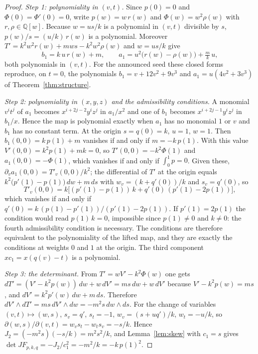 \documentclass[11pt]{article}
\theoremstyle{definition}
\theoremstyle{remark}
\newcommand{\Q}{\mathbb{Q}}
\begin{document}
\begin{proof}
\emph{Step 1: polynomiality in $(v,t)$.} Since $p(0) = 0$ and $\Phi(0) = \Phi'(0) = 0$, write $p(w) = w\,r(w)$ and $\Phi(w) = w^2\rho(w)$ with $r, \rho \in \Q[w]$. Because $w = us/k$ is a polynomial in $(v,t)$ divisible by $s$, $p(w)/s = (u/k)\,r(w)$ is a polynomial. Moreover $T' = k^2 w^2 r(w) + m w s - k^2 w^2\rho(w)$ and $w = us/k$ give
\begin{equation}\label{eq:closed}
b_1 = k\,u\,r(w) + m, \qquad a_1 = u^2\bigl(r(w) - \rho(w)\bigr) + \tfrac{m}{k}\,u,
\end{equation}
both polynomials in $(v,t)$. For the announced seed these closed forms reproduce, on $t = 0$, the polynomials $b_1 = v + 12v^2 + 9v^3$ and $a_1 = u(4v^2 + 3v^3)$ of Theorem~\ref{thm:structure}.

\emph{Step 2: polynomiality in $(x,y,z)$ and the admissibility conditions.} A monomial $v^i t^j$ of $a_1$ becomes $x^{i+2j-2}y^iz^j$ in $a_1/x^2$ and one of $b_1$ becomes $x^{i+2j-1}y^iz^j$ in $b_1/x$. Hence the map is polynomial exactly when $a_1$ has no monomial $1$ or $v$ and $b_1$ has no constant term. At the origin $s = q(0) = k$, $u = 1$, $w = 1$. Then $b_1(0,0) = k\,p(1) + m$ vanishes if and only if $m = -k\,p(1)$. With this value $V'(0,0) = k^2p(1) + mk = 0$, so $T'(0,0) = -k^2\Phi(1)$ and $a_1(0,0) = -\Phi(1)$, which vanishes if and only if $\int_0^1 p = 0$. Given these, $\partial_v a_1(0,0) = T'_v(0,0)/k^2$; the differential of $T'$ at the origin equals $k^2\bigl(p'(1) - p(1)\bigr)\,dw + m\,ds$ with $w_v = (k + q'(0))/k$ and $s_v = q'(0)$, so
\begin{equation}\label{eq:tv}
T'_v(0,0) = k\bigl[(p'(1) - p(1))\,k + q'(0)\,(p'(1) - 2p(1))\bigr],
\end{equation}
which vanishes if and only if $q'(0) = k\,(p(1) - p'(1))/(p'(1) - 2p(1))$. If $p'(1) = 2p(1)$ the condition would read $p(1)\,k = 0$, impossible since $p(1) \neq 0$ and $k \ne 0$: the fourth admissibility condition is necessary. The conditions are therefore equivalent to the polynomiality of the lifted map, and they are exactly the conditions at weights $0$ and $1$ at the origin. The third component $x c_1 = x(q(v) - t)$ is a polynomial.

\emph{Step 3: the determinant.} From $T' = wV' - k^2\Phi(w)$ one gets $dT' = (V' - k^2p(w))\,dw + w\,dV' = m s\,dw + w\,dV'$ because $V' - k^2p(w) = ms$, and $dV' = k^2p'(w)\,dw + m\,ds$. Therefore $dV'\wedge dT' = ms\,dV'\wedge dw = -m^2 s\,dw\wedge ds$. For the change of variables $(v,t)\mapsto(w,s)$, $s_v = q'$, $s_t = -1$, $w_v = (s + uq')/k$, $w_t = -u/k$, so $\partial(w,s)/\partial(v,t) = w_v s_t - w_t s_v = -s/k$. Hence $J_2 = (-m^2s)(-s/k) = m^2 s^2/k$, and Lemma~\ref{lem:skew} with $c_1 = s$ gives $\det J F_{p,k,q} = -J_2/c_1^2 = -m^2/k = -k\,p(1)^2$.


\end{proof}
\end{document}
